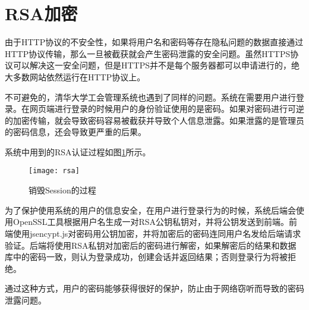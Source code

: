 \section{RSA加密}

由于HTTP协议的不安全性，如果将用户名和密码等存在隐私问题的数据直接通过HTTP协议传输，那么一旦被截获就会产生密码泄露的安全问题。虽然HTTPS协议可以解决这一安全问题，但是HTTPS并不是每个服务器都可以申请进行的，绝大多数网站依然运行在HTTP协议上。

不可避免的，清华大学工会管理系统也遇到了同样的问题。系统在需要用户进行登录。在网页端进行登录的时候用户的身份验证使用的是密码。如果对密码进行可逆的加密传输，就会导致密码容易被截获并导致个人信息泄露。如果泄露的是管理员的密码信息，还会导致更严重的后果。

系统中用到的RSA认证过程如图\ref{fig:rsa}所示。

\begin{figure}[H]
  \centering
  \texttt{[image: rsa]}
  \caption{销毁Session的过程}
  \label{fig:rsa}
\end{figure}

为了保护使用系统的用户的信息安全，在用户进行登录行为的时候，系统后端会使用OpenSSL工具根据用户名生成一对RSA公钥私钥对，并将公钥发送到前端。前端使用jsencypt.js对密码用公钥加密，并将加密后的密码连同用户名发给后端请求验证。后端将使用RSA私钥对加密后的密码进行解密，如果解密后的结果和数据库中的密码一致，则认为登录成功，创建会话并返回结果；否则登录行为将被拒绝。

通过这种方式，用户的密码能够获得很好的保护，防止由于网络窃听而导致的密码泄露问题。
